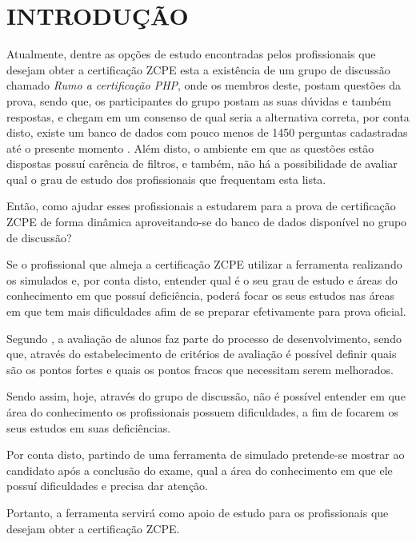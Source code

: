 \chapter{INTRODUÇÃO}
\label{chp:intro}

Atualmente, dentre as opções de estudo encontradas pelos
profissionais que desejam obter a certificação \ac{ZCPE} esta a existência de um
grupo de discussão chamado \textit{Rumo a certificação PHP}, onde os membros
deste, postam questões da prova, sendo que, os participantes do grupo postam as
suas dúvidas e também respostas, e chegam em um consenso de qual seria a
alternativa correta, por conta disto, existe um banco de dados com pouco menos
de 1450 perguntas cadastradas até o presente momento
\cite{googleGroupsRumoACertificaoPHP}. Além disto, o ambiente em que as
questões estão dispostas possuí carência de filtros, e também, não há a
possibilidade de avaliar qual o grau de estudo dos profissionais que frequentam
esta lista.

Então, como ajudar esses profissionais a estudarem para a prova de certificação
\acs{ZCPE} de forma dinâmica aproveitando-se do banco de dados disponível no
grupo de discussão?


Se o profissional que almeja a certificação \acs{ZCPE} utilizar a ferramenta
realizando os simulados e, por conta disto, entender qual é o seu grau de estudo e áreas
do conhecimento em que possuí deficiência, poderá focar os seus estudos
nas áreas em que tem mais dificuldades afim de se preparar efetivamente para
prova oficial.


Segundo , a avaliação de
alunos faz parte do processo de desenvolvimento, sendo que, através do estabelecimento
de critérios de avaliação é possível definir quais são os pontos fortes e quais
os pontos fracos que necessitam serem melhorados.

Sendo assim, hoje, através do grupo de discussão, não é possível entender em
que área do conhecimento os profissionais possuem dificuldades, a fim de focarem
os seus estudos em suas deficiências.

Por conta disto, partindo de uma ferramenta de simulado pretende-se mostrar ao
candidato após a conclusão do exame, qual a área do conhecimento em que ele
possuí dificuldades e precisa dar atenção.

Portanto, a ferramenta servirá como apoio de
estudo para os profissionais que desejam obter a certificação \acs{ZCPE}.

